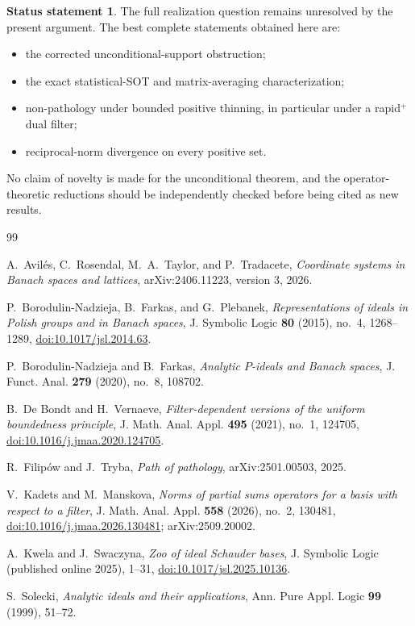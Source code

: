 \documentclass[11pt]{article}
\theoremstyle{definition}
\newtheorem{status}[theorem]{Status statement}
\theoremstyle{remark}
\begin{document}
\begin{status}
The full realization question remains unresolved by the present argument.  The
best complete statements obtained here are:
\begin{itemize}
 \item the corrected unconditional-support obstruction;
 \item the exact statistical-SOT and matrix-averaging characterization;
 \item non-pathology under bounded positive thinning, in particular under a
 rapid$^+$ dual filter;
 \item reciprocal-norm divergence on every positive set.
\end{itemize}
No claim of novelty is made for the unconditional theorem, and the
operator-theoretic reductions should be independently checked before being
cited as new results.
\end{status}

\begin{thebibliography}{99}

A.~Avil\'es, C.~Rosendal, M.~A.~Taylor, and P.~Tradacete,
\emph{Coordinate systems in Banach spaces and lattices},
arXiv:2406.11223, version 3, 2026.

P.~Borodulin-Nadzieja, B.~Farkas, and G.~Plebanek,
\emph{Representations of ideals in Polish groups and in Banach spaces},
J. Symbolic Logic \textbf{80} (2015), no.~4, 1268--1289,
\href{https://doi.org/10.1017/jsl.2014.63}{doi:10.1017/jsl.2014.63}.


P.~Borodulin-Nadzieja and B.~Farkas,
\emph{Analytic $P$-ideals and Banach spaces},
J. Funct. Anal. \textbf{279} (2020), no.~8, 108702.

B.~De Bondt and H.~Vernaeve,
\emph{Filter-dependent versions of the uniform boundedness principle},
J. Math. Anal. Appl. \textbf{495} (2021), no.~1, 124705,
\href{https://doi.org/10.1016/j.jmaa.2020.124705}{doi:10.1016/j.jmaa.2020.124705}.

R.~Filip\'ow and J.~Tryba,
\emph{Path of pathology}, arXiv:2501.00503, 2025.

V.~Kadets and M.~Manskova,
\emph{Norms of partial sums operators for a basis with respect to a filter},
J. Math. Anal. Appl. \textbf{558} (2026), no.~2, 130481,
\href{https://doi.org/10.1016/j.jmaa.2026.130481}{doi:10.1016/j.jmaa.2026.130481};
arXiv:2509.20002.

A.~Kwela and J.~Swaczyna,
\emph{Zoo of ideal Schauder bases},
J. Symbolic Logic (published online 2025), 1--31,
\href{https://doi.org/10.1017/jsl.2025.10136}{doi:10.1017/jsl.2025.10136}.

S.~Solecki,
\emph{Analytic ideals and their applications},
Ann. Pure Appl. Logic \textbf{99} (1999), 51--72.

\end{thebibliography}
\end{document}
